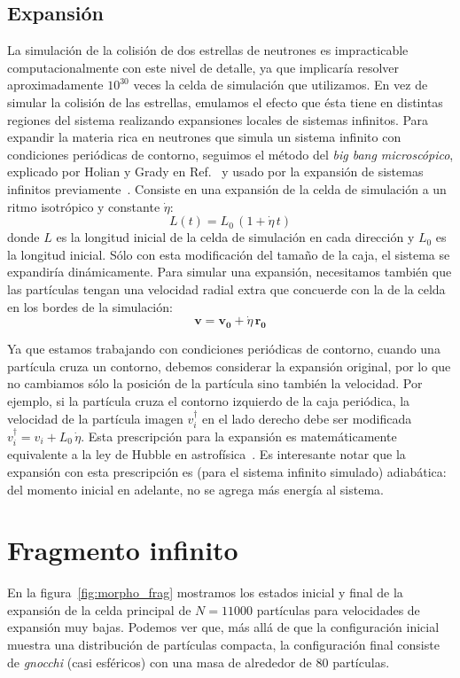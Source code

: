 \subsection{Expansión}\label{sc:expansion}
La simulación de la colisión de dos estrellas de neutrones es impracticable computacionalmente con este nivel de detalle, ya que implicaría resolver aproximadamente $10^{30}$ veces la celda de simulación que utilizamos.
En vez de simular la colisión de las estrellas, emulamos el efecto que ésta tiene en distintas regiones del sistema realizando expansiones locales de sistemas infinitos.
Para expandir la materia rica en neutrones que simula un sistema infinito con condiciones periódicas de contorno, seguimos el método del \emph{big bang microscópico}, explicado por Holian y Grady en Ref.~\cite{holian_fragmentation_1988} y usado por la expansión de sistemas infinitos previamente~\cite{dorso_onset_1996}.
Consiste en una expansión de la celda de simulación a un ritmo isotrópico y constante $\dot{\eta}$:
\begin{equation}
  L(t) = L_0\,(1+\dot{\eta}\,t)
\end{equation}
donde $L$ es la longitud inicial de la celda de simulación en cada dirección y $L_0$ es la longitud inicial.
Sólo con esta modificación del tamaño de la caja, el sistema se expandiría dinámicamente.
Para simular una expansión, necesitamos también que las partículas tengan una velocidad radial extra que concuerde con la de la celda en los bordes de la simulación:
\begin{equation}
  \mathbf{v} = \mathbf{v_0} + \dot{\eta}\,\mathbf{r_0}
\end{equation}

Ya que estamos trabajando con condiciones periódicas de contorno, cuando una partícula cruza un contorno, debemos considerar la expansión original, por lo que no cambiamos sólo la posición de la partícula sino también la velocidad.
Por ejemplo, si la partícula cruza el contorno izquierdo de la caja periódica, la velocidad de la partícula imagen $v_i^\dagger$ en el lado derecho debe ser modificada $v_i^\dagger = v_i + L_0\,\dot{\eta}$.
Esta prescripción para la expansión es matemáticamente equivalente a la ley de Hubble en astrofísica~\cite{chikazumi_quantum_2001}.
Es interesante notar que la expansión con esta prescripción es (para el sistema infinito simulado) adiabática: del momento inicial en adelante, no se agrega más energía al sistema.



\section{Fragmento infinito}
En la figura~\ref{fig:morpho_frag} mostramos los estados inicial y final de la expansión de la celda principal de $N=11000$ partículas para velocidades de expansión muy bajas.
Podemos ver que, más allá de que la configuración inicial muestra una distribución de partículas compacta, la configuración final consiste de \emph{gnocchi} (casi esféricos) con una masa de alrededor de 80 partículas.

